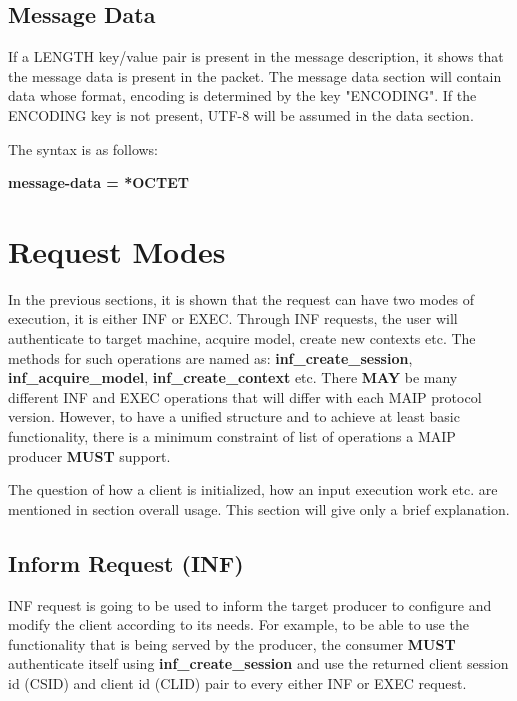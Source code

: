 \documentclass{article}
\begin{document}
\subsection{Message Data}
If a LENGTH key/value pair is present in the message description, it shows that the message data is present in the packet. The message data section will contain data whose format, encoding is determined by the key "ENCODING". If the ENCODING key is not present, UTF-8 will be assumed in the data section. \newline

The syntax is as follows:\newline

\textbf{
\newline
message-data = *OCTET
}

\section{Request Modes}
In the previous sections, it is shown that the request can have two modes of execution, it is either INF or EXEC. Through INF requests, the user will authenticate to target machine, acquire model, create new contexts etc. The methods for such operations are named as: \textbf{inf\_create\_session}, \textbf{inf\_acquire\_model}, \textbf{inf\_create\_context} etc. There \textbf{MAY} be many different INF and EXEC operations that will differ with each MAIP protocol version. However, to have a unified structure and to achieve at least basic functionality, there is a minimum constraint of list of operations a MAIP producer \textbf{MUST} support.\newline

The question of how a client is initialized, how an input execution work etc. are mentioned in section overall usage. This section will give only a brief explanation.

\subsection{Inform Request (INF)}
INF request is going to be used to inform the target producer to configure and modify the client according to its needs. For example, to be able to use the functionality that is being served by the producer, the consumer \textbf{MUST} authenticate itself using \textbf{inf\_create\_session} and use the returned client session id (CSID) and client id (CLID) pair to every either INF or EXEC request.\newline
\end{document}
